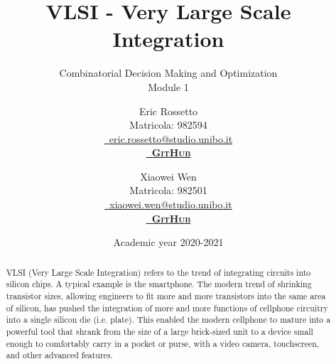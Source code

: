 \documentclass[12pt, a4paper]{article}
\title{\textbf{VLSI - Very Large Scale Integration}}
\subtitle{Combinatorial Decision Making and Optimization \\ Module 1}
\date{Academic year 2020-2021}
\author{Eric Rossetto \\ 
Matricola: 982594 \\
\href{mailto:eric.rossetto@studio.unibo.it}{\faEnvelopeO~eric.rossetto@studio.unibo.it} \\
\href{https://github.com/Erhtric}{\textbf{\textsc{\faGithub~GitHub}}}
\and Xiaowei Wen \\ 
Matricola: 982501 \\
\href{mailto:xiaowei.wen@studio.unibo.it}{\faEnvelopeO~xiaowei.wen@studio.unibo.it} \\
\href{https://github.com/WenXiaowei}{\textbf{\textsc{\faGithub~GitHub}}}
}
\begin{document}
	\maketitle
	
    \hypersetup{linkcolor=blue}
	\begin{abstract}
	\normalsize
    VLSI (Very Large Scale Integration) refers to the trend of integrating circuits into silicon chips. A typical example is the smartphone. The modern trend of shrinking transistor sizes, allowing engineers to fit more and more transistors into the same area of silicon, has pushed the integration of more and more functions of cellphone circuitry into a single silicon die (i.e. plate). This enabled the modern cellphone to mature into a powerful tool that shrank from the size of a large brick-sized unit to a device small enough to comfortably carry in a pocket or purse, with a video camera, touchscreen, and other advanced features.
	\end{abstract}
	\clearpage
	{
    \hypersetup{linkcolor=black}
	\tableofcontents
	\clearpage
	\listoftables
	}

	
	\clearpage

	
	
	
    
    
    
	\nocite{*} %
	\printbibliography
\end{document}
